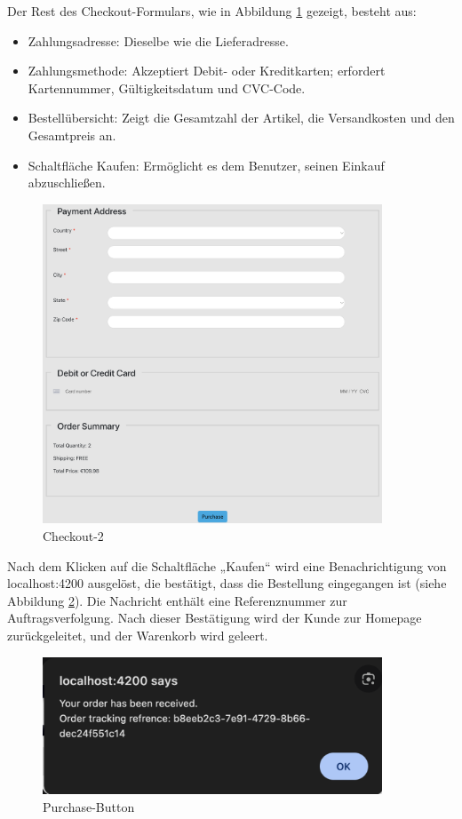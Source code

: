 Der Rest des Checkout-Formulars, wie in Abbildung \ref{fig:sample4-image} gezeigt, besteht aus:
\begin{itemize}
	\item Zahlungsadresse: Dieselbe wie die Lieferadresse.
	\item Zahlungsmethode: Akzeptiert Debit- oder Kreditkarten; erfordert Kartennummer, Gültigkeitsdatum und CVC-Code.
	\item Bestellübersicht: Zeigt die Gesamtzahl der Artikel, die Versandkosten und den Gesamtpreis an.
	\item Schaltfläche Kaufen: Ermöglicht es dem Benutzer, seinen Einkauf abzuschließen.
\end{itemize}

\begin{figure}[H]  
	\centering %
	\includegraphics[width=0.9\textwidth]{Images/Checkout_2.png} 
	\caption{Checkout-2} 
	\label{fig:sample4-image} 
\end{figure}

Nach dem Klicken auf die Schaltfläche „Kaufen“ wird eine Benachrichtigung von localhost:4200 ausgelöst, die bestätigt, dass die Bestellung eingegangen ist (siehe Abbildung \ref{fig:sample5-image}). Die Nachricht enthält eine Referenznummer zur Auftragsverfolgung. Nach dieser Bestätigung wird der Kunde zur Homepage zurückgeleitet, und der Warenkorb wird geleert.

\begin{figure}[H]  
	\centering %
	\includegraphics[width=0.9\textwidth]{Images/Purchase.png} 
	\caption{Purchase-Button} 
	\label{fig:sample5-image} 
\end{figure}

